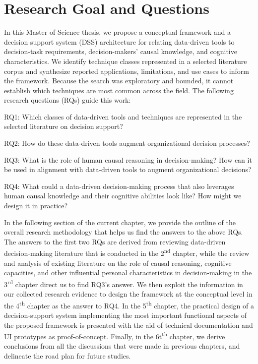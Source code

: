 \documentclass{sfuthesis}
\begin{document}
\section{Research Goal and Questions}
In this Master of Science thesis, we propose a conceptual framework and a decision support system (DSS) architecture for relating data-driven tools to decision-task requirements, decision-makers’ causal knowledge, and cognitive characteristics. We identify technique classes represented in a selected literature corpus and synthesize reported applications, limitations, and use cases to inform the framework. Because the search was exploratory and bounded, it cannot establish which techniques are most common across the field. The following research questions (RQs) guide this work:\par
RQ1: Which classes of data-driven tools and techniques are represented in the selected literature on decision support?\par
RQ2: How do these data-driven tools augment organizational decision processes? \par
RQ3: What is the role of human causal reasoning in decision-making? How can it be used in alignment with data-driven tools to augment organizational decisions?\par
RQ4: What could a data-driven decision-making process that also leverages human causal knowledge and their cognitive abilities look like? How might we design it in practice?\par
In the following section of the current chapter, we provide the outline of the overall research methodology that helps us find the answers to the above RQs. The answers to the first two RQs are derived from reviewing data-driven decision-making literature that is conducted in the 2\textsuperscript{nd} chapter, while the review and analysis of existing literature on the role of causal reasoning, cognitive capacities, and other influential personal characteristics in decision-making in the 3\textsuperscript{rd} chapter direct us to find RQ3’s answer. We then exploit the information in our collected research evidence to design the framework at the conceptual level in the 4\textsuperscript{th} chapter as the answer to RQ4. In the 5\textsuperscript{th} chapter, the practical design of a decision-support system implementing the most important functional aspects of the proposed framework is presented with the aid of technical documentation and UI prototypes as proof-of-concept. Finally, in the 6t\textsuperscript{th} chapter, we derive conclusions from all the discussions that were made in previous chapters, and delineate the road plan for future studies.
\end{document}
